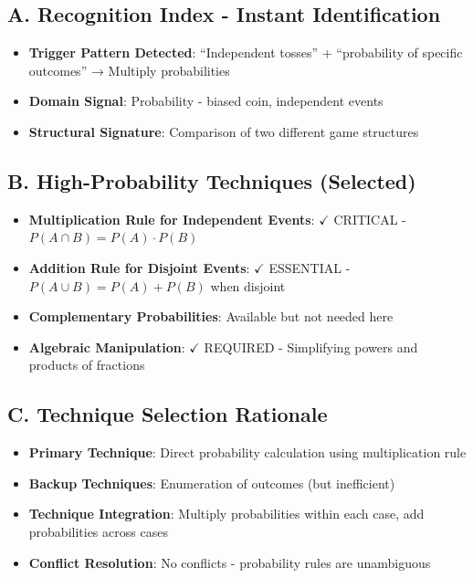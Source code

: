 \documentclass[]{article}
\begin{document}
\begin{techniquesbox}
\subsection*{A. Recognition Index - Instant Identification}
\begin{itemize}[leftmargin=*]
    \item \textbf{Trigger Pattern Detected}: ``Independent tosses'' + ``probability of specific outcomes'' → Multiply probabilities
    \item \textbf{Domain Signal}: Probability - biased coin, independent events
    \item \textbf{Structural Signature}: Comparison of two different game structures
\end{itemize}

\subsection*{B. High-Probability Techniques (Selected)}
\begin{itemize}[leftmargin=*]
    \item \textbf{Multiplication Rule for Independent Events}: $\checkmark$ CRITICAL - $P(A \cap B) = P(A) \cdot P(B)$
    \item \textbf{Addition Rule for Disjoint Events}: $\checkmark$ ESSENTIAL - $P(A \cup B) = P(A) + P(B)$ when disjoint
    \item \textbf{Complementary Probabilities}: Available but not needed here
    \item \textbf{Algebraic Manipulation}: $\checkmark$ REQUIRED - Simplifying powers and products of fractions
\end{itemize}

\subsection*{C. Technique Selection Rationale}
\begin{itemize}[leftmargin=*]
    \item \textbf{Primary Technique}: Direct probability calculation using multiplication rule
    \item \textbf{Backup Techniques}: Enumeration of outcomes (but inefficient)
    \item \textbf{Technique Integration}: Multiply probabilities within each case, add probabilities across cases
    \item \textbf{Conflict Resolution}: No conflicts - probability rules are unambiguous
\end{itemize}


\end{techniquesbox}
\end{document}
